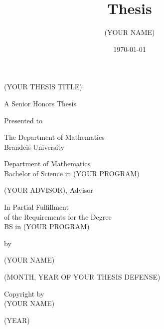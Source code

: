 \documentclass{article}
\title{Thesis}
\author{(YOUR NAME)}
\date{\today}
\begin{document}
\begin{titlepage}
   \begin{center}
       \vspace*{1cm}
       
       (YOUR THESIS TITLE)
       
       \vspace{0.5cm}
       
       A Senior Honors Thesis
       
       \vspace{0.5cm}
       
       Presented to
       
       \vspace{0.5cm}
       
       The Department of Mathematics\\
       Brandeis University
       
       \vspace{0.5cm}
       
       Department of Mathematics\\
       Bachelor of Science in (YOUR PROGRAM)
       
       \vspace{0.5cm}
       
       (YOUR ADVISOR), Advisor
       
       \vspace{0.5cm}
       
       In Partial Fulfillment\\
       of the Requirements for the Degree\\
       BS in (YOUR PROGRAM)
       
       \vspace{0.5cm}
       
       by
       
       \vspace{0.5cm}
       
       (YOUR NAME)
       
       \vspace{0.5cm}
       
       (MONTH, YEAR OF YOUR THESIS DEFENSE)
 
   \end{center}
\end{titlepage}
\thispagestyle{empty}
\vspace*{\fill}
\begin{center}
    Copyright by\\
    (YOUR NAME)
    
    \vspace{0.5cm}
    
    (YEAR)
\end{center}
\end{document}
